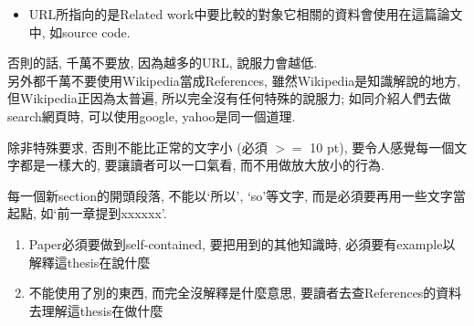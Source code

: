 \begin{enumerate}
{\begin{itemize}
{\begin{itemize}
          \item
          {
            URL所指向的是Related work中要比較的對象它相關的資料會使用在這篇論文中, 如source code.
          } %
        \end{itemize}

        否則的話, 千萬不要放, 因為越多的URL, 說服力會越低.\\

        另外都千萬不要使用Wikipedia當成References, 雖然Wikipedia是知識解說的地方, 但Wikipedia正因為太普遍, 所以完全沒有任何特殊的說服力; 如同介紹人們去做search網頁時, 可以使用google, yahoo是同一個道理.
      } %
    \end{itemize}
  } %
\end{enumerate}


除非特殊要求, 否則不能比正常的文字小 (必須 $ >= $ 10 pt), 要令人感覺每一個文字都是一樣大的, 要讓讀者可以一口氣看, 而不用做放大放小的行為.


每一個新section的開頭段落, 不能以`所以', `so'等文字, 而是必須要再用一些文字當起點, 如`前一章提到xxxxxx'.


\begin{enumerate}
  \item
  {
    Paper必須要做到self-contained, 要把用到的其他知識時, 必須要有example以解釋這thesis在說什麼
  } %

  \item
  {
    不能使用了別的東西, 而完全沒解釋是什麼意思, 要讀者去查References的資料去理解這thesis在做什麼
  } %
\end{enumerate}


